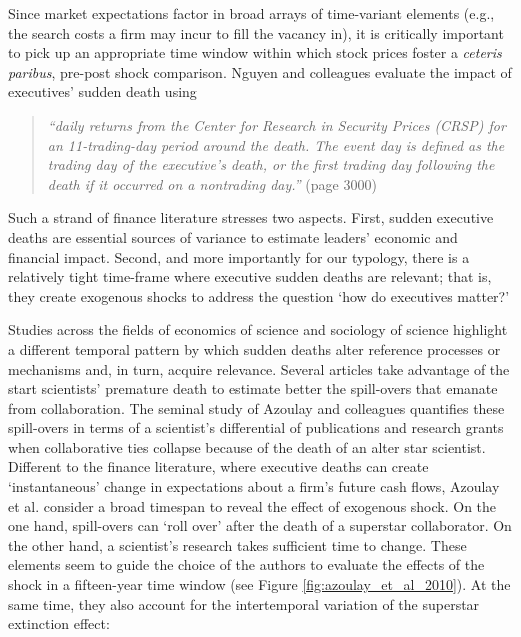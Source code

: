 \documentclass[11pt]{article}
\begin{document}
\begin{refsection}
Since market expectations factor in broad arrays of time-variant elements (e.g.,
the search costs a firm may incur to fill the vacancy in), it is critically
important to pick up an appropriate time window within which stock prices foster
a \textit{ceteris paribus}, pre-post shock comparison. Nguyen and colleagues
\autocite*[][]{nguyen_et_al_2014} evaluate the impact of executives' sudden
death using 

\begin{quote}
  \textit{
    ``daily returns from the Center for Research in Security Prices (CRSP) for
    an 11-trading-day period around the death. The event day is defined as the
    trading day of the executive's death, or the first trading day following the
    death if it occurred on a nontrading day.''
  }
  (page 3000)
\end{quote}

Such a strand of finance literature stresses two aspects. First, sudden executive
deaths are essential sources of variance to estimate leaders' economic and 
financial impact.  Second, and more importantly for our typology,
there is a relatively tight time-frame where executive sudden deaths are
relevant; that is, they create exogenous shocks to address the question 
`how do executives matter?'

Studies across the fields of economics of science and sociology of science highlight a
different temporal pattern by which sudden deaths alter reference  processes or
mechanisms and, in turn, acquire relevance. Several articles
\autocites[e.g.,][]{azoulay_et_al_2019_b,azoulay_et_al_2019_a,khanna_et_al_2021,
aizenam_kletzer_2011,azoulay_et_al_2010,oettl_2012} take advantage of the 
start scientists' premature death to estimate better the spill-overs 
that emanate from collaboration. The seminal study of Azoulay and colleagues 
\autocite*{azoulay_et_al_2010} quantifies these spill-overs in terms of 
a scientist's differential of publications and research grants 
when collaborative ties collapse because of the death of an alter star 
scientist. Different to the finance literature, where executive deaths 
can create `instantaneous' change in expectations about a firm's 
future cash flows, Azoulay et al. \autocite{azoulay_et_al_2010}
consider a broad timespan to reveal the effect of exogenous shock. On the one 
hand, spill-overs can `roll over' after the death of a superstar collaborator. 
On the other hand, a scientist's research takes sufficient time to change. 
These elements seem to guide the choice of the authors to 
evaluate the effects of the shock in a fifteen-year time window
(see Figure \ref{fig:azoulay_et_al_2010}). At the same
time, they also account for the intertemporal variation of the superstar 
extinction effect:
 

\end{refsection}
\end{document}
